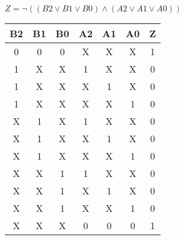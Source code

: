 
\begin{center}
    {\(Z = \lnot ((B2 \lor B1 \lor B0) \land (A2 \lor A1 \lor A0)) \)}
    \begin{table}[h] %
        \begin{center}
            \begin{tabular}{|c|c|c|c|c|c||c|} \hline
            B2 & B1 & B0 & A2 & A1 & A0 & Z \\ \hline\hline
            0  & 0  & 0  & X  & X  & X  & 1\\ \hline
            1  & X  & X  & 1  & X  & X  & 0\\ \hline
            1  & X  & X  & X  & 1  & X  & 0\\ \hline
            1  & X  & X  & X  & X  & 1  & 0\\ \hline
            X  & 1  & X  & 1  & X  & X  & 0\\ \hline
            X  & 1  & X  & X  & 1  & X  & 0\\ \hline
            X  & 1  & X  & X  & X  & 1  & 0\\ \hline
            X  & X  & 1  & 1  & X  & X  & 0\\ \hline
            X  & X  & 1  & X  & 1  & X  & 0\\ \hline
            X  & X  & 1  & X  & X  & 1  & 0\\ \hline
            X  & X  & X  & 0  & 0  & 0  & 1\\ \hline
            \end{tabular}
        \end{center}
    \end{table}
\end{center}
